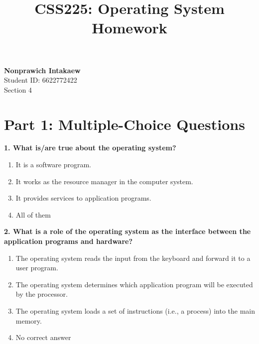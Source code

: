 \documentclass[12pt]{article}
\title{\textbf{CSS225: Operating System \\ Homework}}
\date{}
\begin{document}
\maketitle
\vspace{4cm}
\begin{center}
\Huge{}
\end{center}

\vspace{5cm}
\begin{center}
  \large\textbf{Nonprawich Intakaew} \\[0.2cm]
    \large Student ID: 6622772422 \\[0.2cm]
    \large Section 4
\end{center}
\newpage
\section*{Part 1: Multiple-Choice Questions}

\textbf{1. What is/are true about the operating system?}
\begin{enumerate}[label=\alph*)]
    \item It is a software program.
    \item It works as the resource manager in the computer system.
    \item It provides services to application programs.
    \item All of them
\end{enumerate} \vspace{15pt}
\noindent \textbf{2. What is a role of the operating system as the interface between the application programs and
hardware?}
\begin{enumerate}[label=\alph*)]
    \item The operating system reads the input from the keyboard and forward it to a user program.
    \item The operating system determines which application program will be executed by the processor.
    \item The operating system loads a set of instructions (i.e., a process) into the main memory.
    \item No correct answer
\end{enumerate} \vspace{15pt}
\end{document}
